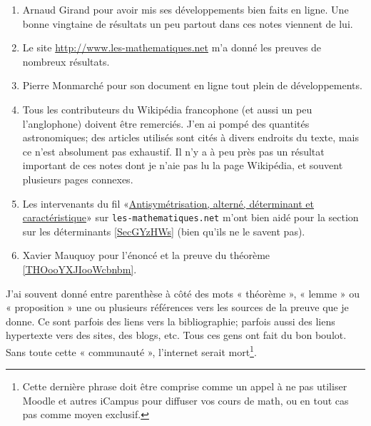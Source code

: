 \begin{enumerate}
            \item 
                Arnaud Girand pour avoir mis ses développements bien faits en ligne. Une bonne vingtaine de résultats un peu partout dans ces notes viennent de lui.
            \item
                Le site \url{http://www.les-mathematiques.net} m'a donné les preuves de nombreux résultats.
            \item
                Pierre Monmarché pour son document en ligne tout plein de développements.
    \item
        Tous les contributeurs du Wikipédia francophone (et aussi un peu l'anglophone) doivent être remerciés. J'en ai pompé des quantités astronomiques; des articles utilisés sont cités à divers endroits du texte, mais ce n'est absolument pas exhaustif. Il n'y a à peu près pas un résultat important de ces notes dont je n'aie pas lu la page Wikipédia, et souvent plusieurs pages connexes.
    \item
        Les intervenants du fil «\href{http://www.les-mathematiques.net/phorum/read.php?2,302266}{Antisymétrisation, alterné, déterminant et caractéristique}» sur \texttt{les-mathematiques.net} m'ont bien aidé pour la section sur les déterminants \ref{SecGYzHWs} (bien qu'ils ne le savent pas).
    \item
        Xavier Mauquoy pour l'énoncé et la preuve du théorème \ref{THOooYXJIooWcbnbm}.
\end{enumerate}

J'ai souvent donné entre parenthèse à côté des mots « théorème », « lemme » ou « proposition » une ou plusieurs références vers les sources de la preuve que je donne. Ce sont parfois des liens vers la bibliographie; parfois aussi des liens hypertexte vers des sites, des blogs, etc. Tous ces gens ont fait du bon boulot. Sans toute cette « communauté », l'internet serait mort\footnote{Cette dernière phrase doit être comprise comme un appel à ne pas utiliser Moodle et autres iCampus pour diffuser vos cours de math, ou en tout cas pas comme moyen exclusif.}.
